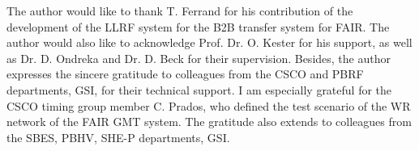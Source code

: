 The author would like to thank T. Ferrand for his contribution of the development of the LLRF system for the B2B transfer system for FAIR. The author would also like to acknowledge Prof. Dr. O. Kester for his support, as well as Dr. D. Ondreka and Dr. D. Beck for their supervision. Besides, the author expresses the sincere gratitude to colleagues from the CSCO and PBRF departments, GSI, for their technical support. I am
especially grateful for the CSCO timing group member C. Prados, who defined the test scenario of the WR network of the FAIR GMT system. The gratitude also extends to colleagues from the SBES, PBHV, SHE-P departments, GSI. 